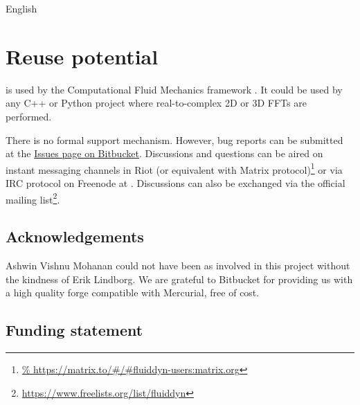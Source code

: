 
English

\section{Reuse potential}


 is used by the Computational Fluid Mechanics framework
 \citep{fluidsim}. It could be used by any C++ or Python project
where real-to-complex 2D or 3D FFTs are performed.

There is no formal support mechanism. However, bug reports can be submitted at
the \href{https://bitbucket.org/fluiddyn/fluidsim/issues}{Issues page on
Bitbucket}. Discussions and questions can be aired on instant messaging
channels in Riot (or equivalent with Matrix protocol)\footnote{
\url{%
  https://matrix.to/\#/\#fluiddyn-users:matrix.org}}
or via IRC protocol on Freenode at . Discussions
can also be exchanged via the official mailing list\footnote{
\url{https://www.freelists.org/list/fluiddyn}}.

\subsection{Acknowledgements}


Ashwin Vishnu Mohanan could not have been as involved in this project without the
kindness of Erik Lindborg.
%
We are grateful to Bitbucket for providing us with a high quality forge
compatible with Mercurial, free of cost.

\subsection{Funding statement}

